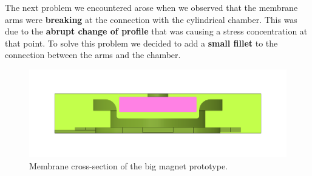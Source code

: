 The next problem we encountered arose when we observed that the membrane arms were \textbf{breaking} at the connection with the cylindrical chamber.
This was due to the \textbf{abrupt change of profile} that was causing a stress concentration at that point.
To solve this problem we decided to add a \textbf{small fillet} to the connection between the arms and the chamber.
\begin{figure}[H]
    \centering
    \includegraphics[width=0.9\linewidth]{Chapters/Chapter5/Flexible_Mat_Prototypes/Figures/membrane_v2_section.png}
    \caption{Membrane cross-section of the big magnet prototype.}
    \label{fig: Membrane_v2_section}
\end{figure}